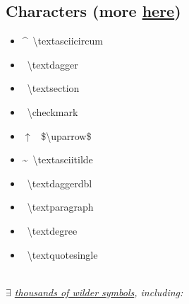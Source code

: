 
\subsection*{Characters (more \href{http://tug.ctan.org/info/symbols/comprehensive/symbols-a4.pdf}{here})}

\begin{minipage}{3cm}
\begin{itemize}[label=\empty,leftmargin=*]
    \item \textasciicircum \, \textbackslash textasciicircum
    \item \textdagger \, \textbackslash textdagger
    \item \textsection \, \textbackslash textsection
    \item \checkmark \, \textbackslash checkmark
    \item $\uparrow$ \, \$\textbackslash uparrow\$
\end{itemize} 
\end{minipage}
\begin{minipage}{3cm}
\begin{itemize}[label={},leftmargin=*]
    \item \textasciitilde \, \textbackslash textasciitilde
    \item \textdaggerdbl \, \textbackslash textdaggerdbl
    \item \textparagraph \, \textbackslash textparagraph
    \item \textdegree \, \textbackslash textdegree
    \item \textquotesingle \, \textbackslash textquotesingle
\end{itemize} 
\end{minipage}\ \\[1mm]
%
\textit{$\exists$ \href{http://tug.ctan.org/info/symbols/comprehensive/symbols-a4.pdf}{thousands of wilder symbols}, including:} \\%
\\
\\
\\
